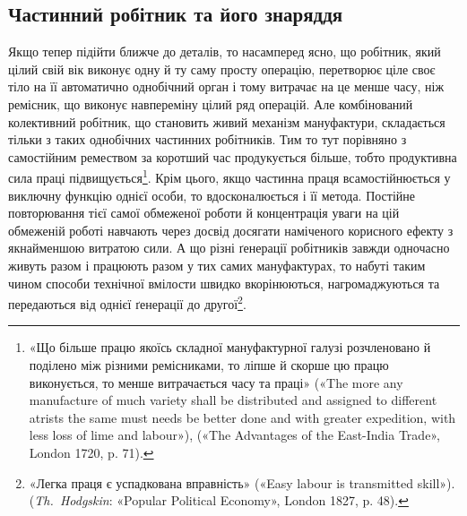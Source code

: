 \subsection{Частинний робітник та його знаряддя}

Якщо тепер підійти ближче до деталів, то насамперед ясно,
що робітник, який цілий свій вік виконує одну й ту саму просту
операцію, перетворює ціле своє тіло на її автоматично однобічний
орган і тому витрачає на це менше часу, ніж ремісник, що
виконує навпереміну цілий ряд операцій. Але комбінований
колективний робітник, що становить живий механізм мануфактури,
складається тільки з таких однобічних частинних робітників.
Тим то тут порівняно з самостійним ремеством за коротший
час продукується більше, тобто продуктивна сила праці підвищується\footnote{
«Що більше працю якоїсь складної мануфактурної галузі розчленовано
й поділено між різними ремісниками, то ліпше й скорше цю працю виконується,
то менше витрачається часу та праці» («The more any manufacture
of much variety shall be distributed and assigned to different atrists
the same must needs be better done and with greater expedition, with less
loss of lime and labour»), («The Advantages of the East-India Trade»,
London 1720, p. 71).
}.
Крім цього, якщо частинна праця всамостійнюється
у виключну функцію однієї особи, то вдосконалюється і її метода.
Постійне повторювання тієї самої обмеженої роботи й концентрація
уваги на цій обмеженій роботі навчають через досвід досягати
наміченого корисного ефекту з якнайменшою витратою сили.
А що різні ґенерації робітників завжди одночасно живуть разом
і працюють разом у тих самих мануфактурах, то набуті таким
чином способи технічної вмілости швидко вкорінюються, нагромаджуються
та передаються від однієї ґенерації до другої\footnote{
«Легка праця є успадкована вправність» («Easy labour is transmitted
skill»). (\emph{Th.~Hodgskin}: «Popular Political Economy», London 1827, p. 48).
}.

